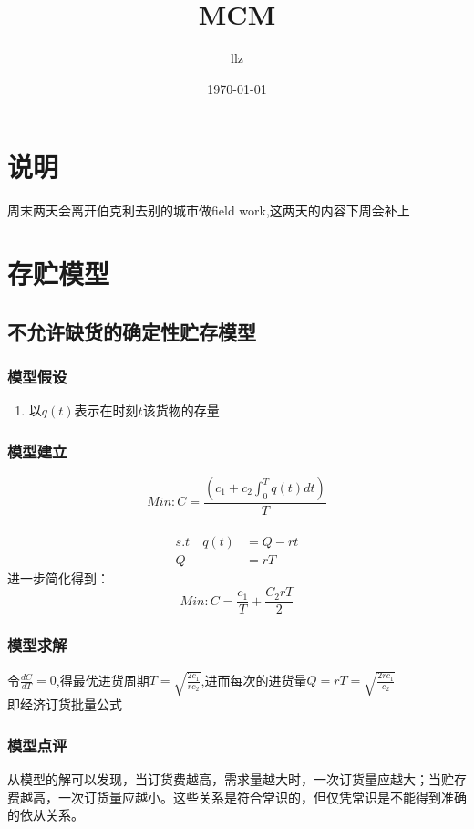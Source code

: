 \documentclass[12pt,a4paper]{article}
\title{MCM}
\author{llz}
\date{\today}
\begin{document}
\kaishu
\maketitle

\section{说明}
周末两天会离开伯克利去别的城市做field work,这两天的内容下周会补上

\section{存贮模型}
\subsection{不允许缺货的确定性贮存模型}
\subsubsection{模型假设}
\begin{enumerate}
，单位时间（每天）对物品的需求量恒为$r$吨；即经营商品单一，顾客对该物品需求量在时间上保持恒定；
$T$天进货$Q$吨；且假设每次进货是在存货全部售出后即刻进行，不允许缺货，即$Q=rT$;
$c_1$，在正常期间，还需支付货物的贮存费用，单位时间（天）单位（吨）货物需支付货物的贮存费用$c_2$;
\item 以$q(t)$表示在时刻$t$该货物的存量
\end{enumerate}
\subsubsection{模型建立}
 $$Min:C=\frac{(c_1+c_2\int_{0}^{T}q(t)dt)}{T}$$\\
\begin{displaymath}
\begin{split}
 s.t \quad q(t)&=Q-rt\\
 Q&=rT
\end{split}
\end{displaymath}
进一步简化得到：\\
$$Min: C=\frac{c_1}{T}+\frac{C_2 rT}{2}$$
\subsubsection{模型求解}
令$\frac{dC}{dT}=0$,得最优进货周期$T=\sqrt{\frac{2c_1}{rc_2}}$,进而每次的进货量$Q=rT=\sqrt{\frac{2rc_1}{c_2}}$\\
即经济订货批量公式

\subsubsection{模型点评}
从模型的解可以发现，当订货费越高，需求量越大时，一次订货量应越大；当贮存费越高，一次订货量应越小。这些关系是符合常识的，但仅凭常识是不能得到准确的依从关系。
\end{document}
